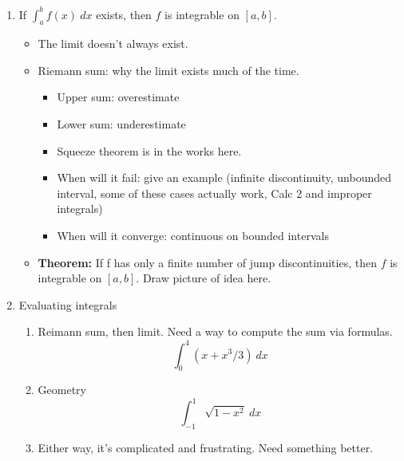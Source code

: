 \documentclass{article}
\newcommand{\ds}{\displaystyle}
\begin{document}
\begin{enumerate}
\item If $\ds\int_a^b f(x)~dx$ exists, then $f$ is integrable on $[a,b]$. 
\begin{itemize}
\item The limit doesn't always exist.
\item Riemann sum: why the limit exists much of the time.
\begin{itemize}
\item Upper sum: overestimate
\item Lower sum: underestimate
\item Squeeze theorem is in the works here.
\item When will it fail: give an example (infinite discontinuity, unbounded interval, some of these cases actually work, Calc 2 and improper integrals)
\item When will it converge: continuous on bounded intervals
\end{itemize}
\item {\bf Theorem:} If f has only a finite number of jump discontinuities, then $f$ is integrable on $[a,b]$. Draw picture of idea here.
\end{itemize}

\item Evaluating integrals
\begin{enumerate}
\item Reimann sum, then limit. Need a way to compute the sum via formulas.
$$
\int_0^4 (x+x^3/3)~dx
$$
\item Geometry
$$
\int_{-1}^1 \sqrt{1-x^2}~dx
$$
\item Either way, it's complicated and frustrating. Need something better.
\end{enumerate}
\end{enumerate}


\end{document}
